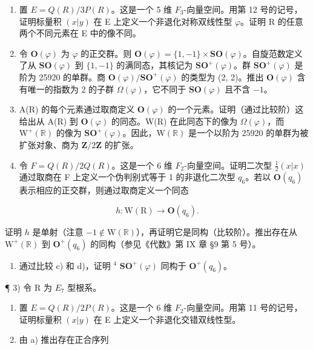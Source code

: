 \begin{enumerate}
\def\labelenumi{\alph{enumi})}
\item
  置 \(E = Q(R)/3P(R)\)。这是一个 5 维 \(F_{3}\)-向量空间。用第 12 号的记号，证明标量积 \((x|y)\) 在 E 上定义一个非退化对称双线性型 \(\varphi\)。证明 R 的任意两个不同元素在 E 中的像不同。
\item
  令 \(\mathbf{O}(\varphi)\) 为 \(\varphi\) 的正交群。则 \(\mathbf{O}(\varphi) = \{1, -1\} \times \mathbf{SO}(\varphi)\)。自旋范数定义了从 \(\mathbf{SO}(\varphi)\) 到 \(\{1, -1\}\) 的满同态，其核记为 \(\mathbf{SO}^{+}(\varphi)\)。群 \(\mathbf{SO}^{+}(\varphi)\) 是阶为 25920 的单群。商 \(\mathbf{O}(\varphi)/\mathbf{SO}^{+}(\varphi)\) 的类型为 (2, 2)。推出 \(\mathbf{O}(\varphi)\) 含有唯一的指数为 2 的子群 \(\Omega(\varphi)\)，它不同于 \(\mathbf{SO}(\varphi)\) 且不含 \(-1\)。
\item
  A(R) 的每个元素通过取商定义 \(\mathbf{O}(\varphi)\) 的一个元素。证明（通过比较阶）这给出从 A(R) 到 \(\mathbf{O}(\varphi)\) 的同态。W(R) 在此同态下的像为 \(\Omega(\varphi)\)，而 \(\mathrm{W}^{+}(\mathbb{R})\) 的像为 \(\mathbf{SO}^{+}(\varphi)\)。因此，\(\mathrm{W}(\mathbb{R})\) 是一个以阶为 25920 的单群为被扩张对象、商为 \(\mathbf{Z}/2\mathbf{Z}\) 的扩张。
\item
  令 \(F = Q(R)/2Q(R)\)。这是一个 6 维 \(F_{2}\)-向量空间。证明二次型 \(\frac{1}{2}(x|x)\) 通过取商在 F 上定义一个伪判别式等于 1 的非退化二次型 \(q_{6}\)。若以 \(\mathbf{O}(q_{6})\) 表示相应的正交群，则通过取商定义一个同态
\end{enumerate}

\[
h: \mathrm{W} (\mathrm{R}) \rightarrow \mathbf {O} (q _ {6}).
\]

证明 \(h\) 是单射（注意 \(-1 \notin \mathrm{W}(\mathbb{R})\)），再证明它是同构（比较阶）。推出存在从 \(\mathrm{W}^{+}(\mathbb{R})\) 到 \(\mathbf{O}^{+}(q_{6})\) 的同构（参见《代数》第 IX 章 §9 第 5 号）。

\begin{enumerate}
\def\labelenumi{\alph{enumi})}
\setcounter{enumi}{2}
\tightlist
\item
  通过比较 c) 和 d)，证明 \(^{4}\) \(\mathbf{SO}^{+}(\varphi)\) 同构于 \(\mathbf{O}^{+}(q_{6})\)。
\end{enumerate}

¶ 3) 令 R 为 \(E_{7}\) 型根系。

\begin{enumerate}
\def\labelenumi{\alph{enumi})}
\item
  置 \(E = Q(R)/2P(R)\)。这是一个 6 维 \(F_{2}\)-向量空间。用第 11 号的记号，证明标量积 \((x|y)\) 在 E 上定义一个非退化交错双线性型。
\item
  由 a) 推出存在正合序列
\end{enumerate}

